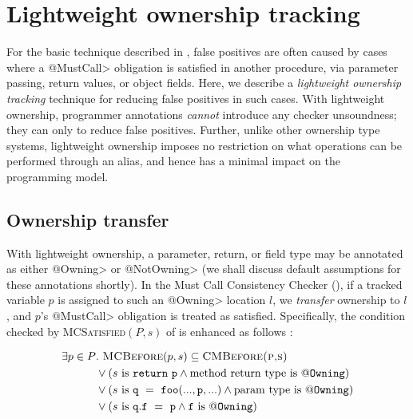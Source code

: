 \section{Lightweight ownership tracking}
\label{sec:lightweight-ownership}

For the basic technique described in , false
positives are often caused by cases where a \<@MustCall> obligation is satisfied
in another procedure, via parameter passing, return values, or object fields.
Here, we describe a \emph{lightweight ownership tracking} technique for reducing
false positives in such cases.  With lightweight ownership, programmer
annotations \emph{cannot} introduce any checker unsoundness; they can only to
reduce false positives.  Further, unlike other ownership type systems,
lightweight ownership imposes no restriction on what operations can be performed
through an alias, and hence has a minimal impact on the programming model.


\subsection{Ownership transfer}
\label{sec:ownership-transfer}


With lightweight ownership, a parameter, return, or field type may be annotated
as either \<@Owning> or \<@NotOwning> (we shall discuss default assumptions for
these annotations shortly).  In
the Must Call Consistency Checker (), if a tracked
variable $p$ is assigned to such an \<@Owning> location $l$, we \emph{transfer}
ownership to $l$, and $p$'s \<@MustCall> obligation
is treated as satisfied. Specifically, the condition checked by
\textsc{MCSatisfied}$(P,s)$ of  is enhanced as follows
:

\begin{align*}
  \exists p \in P &.\ \textsc{MCBefore}(p,s) \subseteq \textsc{CMBefore(p,s)}\\
                  &\vee (s \mathrm{\ is\ } \mathtt{return\ p} \wedge \mathrm{method\ return\ type\ is\ } \mathtt{@Owning})\\
                  &\vee (s \mathrm{\ is\ } \mathtt{q\ =\ foo(...,p,...)} \wedge \mathrm{param\ type\ is\ } \mathtt{@Owning})\\
                  &\vee (s \mathrm{\ is\ } \mathtt{q.f\ =\ p} \wedge \mathtt{f} \mathrm{\ is\ } \mathtt{@Owning})\\
\end{align*}

